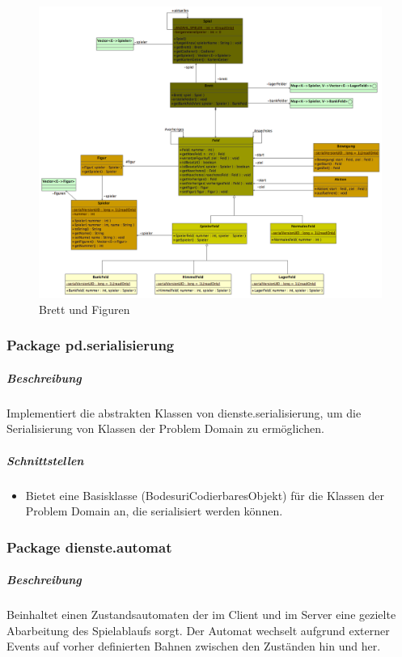 \documentclass[12pt,halfparskip]{scrartcl}
\begin{document}
\label{ssub:diagramme}
\begin{figure}[h]
	\centering
	\includegraphics[width=\textwidth]{pd_brett}
	\caption{Brett und Figuren}
	\label{fig:pd_brett}
\end{figure}


\clearpage
\subsubsection{Package pd.serialisierung}

\subparagraph{Beschreibung}
Implementiert die abstrakten Klassen von dienste.serialisierung, um die Serialisierung von Klassen der Problem Domain zu ermöglichen.

\subparagraph{Schnittstellen}
\begin{itemize}
	\item Bietet eine Basisklasse (BodesuriCodierbaresObjekt) für die Klassen der Problem Domain an, die serialisiert werden können.
\end{itemize}

\clearpage
\subsubsection{Package dienste.automat} %
\label{ssub:package_dienste}
\subparagraph{Beschreibung}
Beinhaltet einen Zustandsautomaten der im Client und im Server eine gezielte Abarbeitung
des Spielablaufs sorgt. Der Automat wechselt aufgrund externer Events auf vorher definierten
Bahnen zwischen den Zuständen hin und her.
\end{document}

